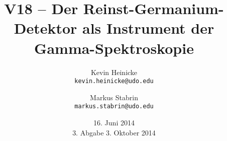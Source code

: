 

\title{%
    V18 -- Der Reinst-Germanium-Detektor als Instrument der Gamma-Spektroskopie
}
\author{%
    Kevin Heinicke\\
    \texttt{kevin.heinicke@udo.edu}
    \and
    Markus Stabrin\\
    \texttt{markus.stabrin@udo.edu}
}

\date{
    16. Juni 2014\\
    {\small 3. Abgabe} 3. Oktober 2014
}

    \maketitle%
    \tableofcontents
    \newpage

    
    

    \printbibliography

